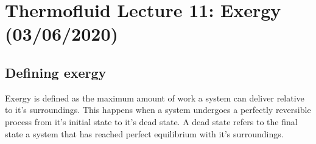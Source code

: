 \documentclass[11pt, a4paper]{article}
\begin{document}
\setcounter{equation}{0}
\setcounter{section}{10}

\section{Thermofluid Lecture 11: Exergy (03/06/2020)}

\subsection{Defining exergy}
Exergy is defined as the maximum amount of work a system can deliver relative to it's surroundings. This happens when a system undergoes a perfectly reversible process from it's initial state to it's dead state. A dead state refers to the final state a system that has reached perfect equilibrium with it's surroundings.
\end{document}
